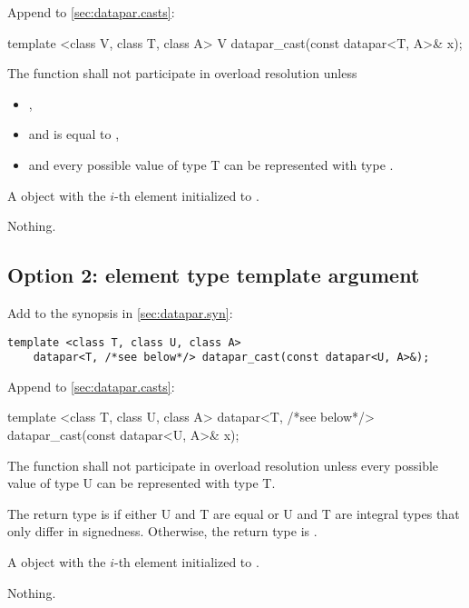 Append to \ref{sec:datapar.casts}:
\begin{wgText}
  \begin{itemdecl}
    template <class V, class T, class A> V datapar_cast(const datapar<T, A>& x);
  \end{itemdecl}
  \begin{itemdescr}
    \pnum\remarks The function shall not participate in overload resolution unless
    \begin{itemize}
      \item {},
      \item and  is equal to ,
      \item and every possible value of type \type T can be represented with type \datapar\code{::}.
    \end{itemize}
    \pnum\returns A \datapar object with the $i$-th element initialized to .

    \pnum\throws Nothing.
  \end{itemdescr}
\end{wgText}

\subsection{Option 2: element type template argument}
Add to the synopsis in \ref{sec:datapar.syn}:
\begin{wgText}
  \begin{lstlisting}[style=Vc]
    template <class T, class U, class A>
    datapar<T, /*see below*/> datapar_cast(const datapar<U, A>&);
  \end{lstlisting}
\end{wgText}

Append to \ref{sec:datapar.casts}:
\begin{wgText}
  \begin{itemdecl}
    template <class T, class U, class A>
    datapar<T, /*see below*/> datapar_cast(const datapar<U, A>& x);
  \end{itemdecl}
  \begin{itemdescr}
    \pnum\remarks The function shall not participate in overload resolution unless every possible value of type \type U can be represented with type \type T.

    \pnum\remarks The return type is \datapar[<T, A>] if either \type U and \type T are equal or \type U and \type T are integral types that only differ in signedness.
    Otherwise, the return type is .

    \pnum\returns A \datapar object with the $i$-th element initialized to .

    \pnum\throws Nothing.
  \end{itemdescr}
\end{wgText}

